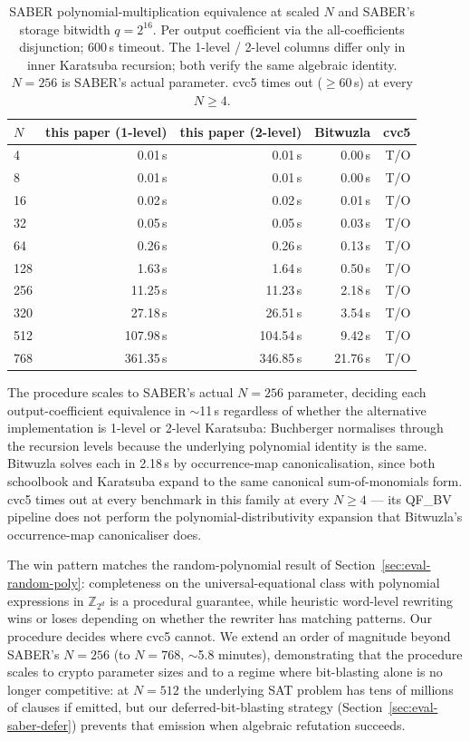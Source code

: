 \documentclass[runningheads]{llncs}
\begin{document}
\begin{table}[ht]
\caption{SABER polynomial-multiplication equivalence at scaled
$N$ and SABER's storage bitwidth $q = 2^{16}$. Per output
coefficient via the all-coefficients disjunction; 600\,s
timeout. The 1-level / 2-level columns differ only in inner
Karatsuba recursion; both verify the same algebraic identity.
$N = 256$ is SABER's actual parameter. cvc5 times out
($\geq 60\,$s) at every $N \geq 4$.}
\label{tab:saber-scaling}
\centering
\small
\begin{tabular}{lrrrr}
\toprule
$N$ & this paper (1-level) & this paper (2-level) & Bitwuzla & cvc5 \\
\midrule
4   & 0.01\,s   & 0.01\,s   & 0.00\,s & T/O \\
8   & 0.01\,s   & 0.01\,s   & 0.00\,s & T/O \\
16  & 0.02\,s   & 0.02\,s   & 0.01\,s & T/O \\
32  & 0.05\,s   & 0.05\,s   & 0.03\,s & T/O \\
64  & 0.26\,s   & 0.26\,s   & 0.13\,s & T/O \\
128 & 1.63\,s   & 1.64\,s   & 0.50\,s & T/O \\
256 & 11.25\,s  & 11.23\,s  & 2.18\,s & T/O \\
320 & 27.18\,s  & 26.51\,s  & 3.54\,s & T/O \\
512 & 107.98\,s & 104.54\,s & 9.42\,s & T/O \\
768 & 361.35\,s & 346.85\,s & 21.76\,s & T/O \\
\bottomrule
\end{tabular}
\end{table}

The procedure scales to SABER's actual $N = 256$ parameter,
deciding each output-coefficient equivalence in $\sim$11\,s
regardless of whether the alternative implementation is 1-level
or 2-level Karatsuba: Buchberger normalises through the
recursion levels because the underlying polynomial identity is
the same. Bitwuzla solves each in 2.18\,s by occurrence-map
canonicalisation, since both schoolbook and Karatsuba expand
to the same canonical sum-of-monomials form. cvc5 times out
at every benchmark in this family at every $N \geq 4$ --- its
QF\_BV pipeline does not perform the polynomial-distributivity
expansion that Bitwuzla's occurrence-map canonicaliser does.

The win pattern matches the random-polynomial result of
Section~\ref{sec:eval-random-poly}: completeness on the
universal-equational class with polynomial expressions in
$\mathbb{Z}_{2^d}$ is a procedural guarantee, while heuristic
word-level rewriting wins or loses depending on whether the
rewriter has matching patterns. Our procedure decides where
cvc5 cannot. We extend an order of magnitude beyond SABER's
$N = 256$ (to $N = 768$, $\sim$5.8 minutes), demonstrating that
the procedure scales to crypto parameter sizes and to a regime
where bit-blasting alone is no longer competitive: at $N = 512$
the underlying SAT problem has tens of millions of clauses if
emitted, but our deferred-bit-blasting strategy
(Section~\ref{sec:eval-saber-defer}) prevents that emission
when algebraic refutation succeeds.
\end{document}
